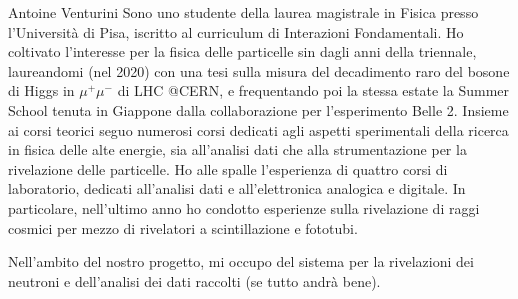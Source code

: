 \begin{crewbio}{Antoine Venturini}
Sono uno studente della laurea magistrale in Fisica presso l'Università di Pisa, iscritto al curriculum di Interazioni Fondamentali. Ho coltivato l'interesse per la fisica delle particelle sin dagli anni della triennale, laureandomi (nel 2020) con una tesi sulla misura del decadimento raro del bosone di Higgs in $\mu^+ \mu^-$ di LHC @CERN, e frequentando poi la stessa estate la Summer School tenuta in Giappone dalla collaborazione per l'esperimento Belle 2.  
Insieme ai corsi teorici seguo numerosi corsi dedicati agli aspetti sperimentali della ricerca in fisica delle alte energie, sia all'analisi dati che alla strumentazione per la rivelazione delle particelle.
Ho alle spalle l'esperienza di quattro corsi di laboratorio, dedicati all'analisi dati e all'elettronica analogica e digitale. In particolare, nell'ultimo anno ho condotto esperienze sulla rivelazione di raggi cosmici per mezzo di rivelatori a scintillazione e fototubi. 

Nell'ambito del nostro progetto, mi occupo del sistema per la rivelazioni dei neutroni e dell'analisi dei dati raccolti (se tutto andrà bene). 
\end{crewbio}


